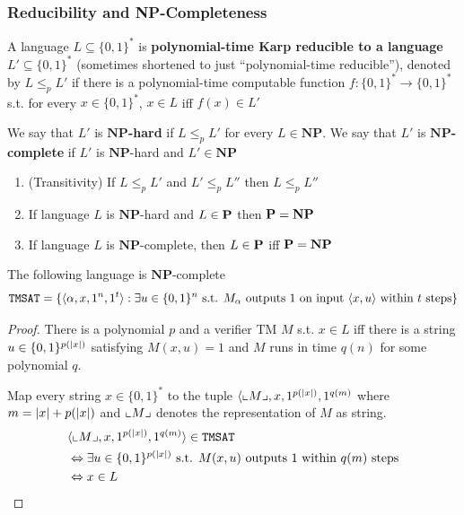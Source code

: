 \documentclass[11pt]{article}
\def \NP {\textbf{NP}}
\def \NP {\textbf{NP}}
\def \TMSAT {\texttt{TMSAT}}
\begin{document}
\subsubsection{Reducibility and NP-Completeness}
\label{sec:org80540e8}
\begin{definition}[]
A language \(L\subseteq\{0,1\}^*\) is \textbf{polynomial-time Karp reducible to a
language} \(L'\subseteq\{0,1\}^*\) (sometimes shortened to just ``polynomial-time reducible''), denoted
by \(L\le_p L'\) if there is a polynomial-time
computable function \(f:\{0,1\}^*\to\{0,1\}^*\) s.t. for every \(x\in\{0,1\}^*\),
\(x\in L\) iff \(f(x)\in L'\)

We say that \(L'\) is \textbf{\(\NP\)-hard} if \(L\le_pL'\) for every \(L\in\NP\). We say that \(L'\)
is \textbf{\(\NP\)-complete} if \(L'\) is \(\NP\)-hard and \(L'\in\NP\)
\end{definition}

\begin{theorem}[]
\begin{enumerate}
\item (Transitivity) If \(L\le_pL'\) and \(L'\le_pL''\) then \(L\le_pL''\)
\item If language \(L\) is \(\NP\)-hard and \(L\in\operatorname{\textbf{P}}\) then \(\bP=\NP\)
\item If language \(L\) is \(\NP\)-complete, then \(L\in\operatorname{\textbf{P}}\) iff \(\bP=\NP\)
\end{enumerate}
\end{theorem}

\begin{theorem}[]
The following language is \(\NP\)-complete
    \begin{equation*}
\TMSAT=\{\la\alpha,x,1^n,1^t\ra:\exists u\in\{0,1\}^n\text{ s.t. }M_\alpha\text{ outputs }1
\text{ on input }\la x,u\ra\text{ within }t\text{ steps}\}
    \end{equation*}
\end{theorem}

\begin{proof}
There is a polynomial \(p\) and a verifier TM \(M\) s.t. \(x\in L\) iff there is a
string \(u\in\{0,1\}^{p(\abs{x})}\) satisfying \(M(x,u)=1\) and \(M\) runs in time \(q(n)\) for
some polynomial \(q\).

Map every string \(x\in\{0,1\}^*\) to the tuple \(\la\lcorner{M},x,1^{p(\abs{x})},1^{q(m)}\)
where \(m=\abs{x}+p(\abs{x})\) and \(\llcorner M \lrcorner\) denotes the representation of \(M\) as
string.
    \begin{align*}
&\la\lcorner{M},x,1^{p(\abs{x})},1^{q(m)}\ra\in\TMSAT\\
&\Leftrightarrow\exists u\in\{0,1\}^{p(\abs{x})}\text{ s.t. }M(x,u)\text{ outputs 1 within }q(m)\text{ steps}\\
&\Leftrightarrow x\in L
    \end{align*}
\end{proof}
\end{document}
